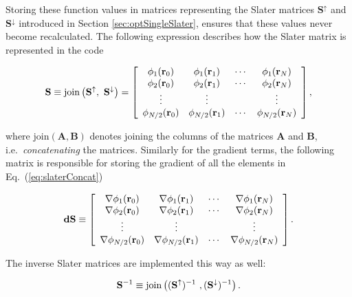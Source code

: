 Storing these function values in matrices representing the Slater matrices $\mathbf{S}^\uparrow$ and $\mathbf{S}^\downarrow$ introduced in Section \ref{sec:optSingleSlater}, ensures that these values never become recalculated. The following expression describes how the Slater matrix is represented in the code 

\begin{equation}
\label{eq:slaterConcat}
 \mathbf{S}  \equiv \mathrm{join}\left(\mathbf{S}^\uparrow,\,\,\mathbf{S}^\downarrow\right) = \left[ \begin{array}{cccc}
\phi_1(\mathbf{r}_0)     & \phi_1(\mathbf{r}_1)     & \cdots & \phi_1(\mathbf{r}_N)       \\
\phi_2(\mathbf{r}_0)     & \phi_2(\mathbf{r}_1)     & \cdots & \phi_2(\mathbf{r}_N)       \\
\vdots          & \vdots          &        & \vdots            \\
\phi_{N/2}(\mathbf{r}_0) & \phi_{N/2}(\mathbf{r}_1) & \cdots & \phi_{N/2}(\mathbf{r}_N)   \end{array} \right],
\end{equation}

where $\mathrm{join}(\mathbf{A}, \mathbf{B})$ denotes joining the columns of the matrices $\mathbf{A}$ and $\mathbf{B}$, i.e.~\textit{concatenating} the matrices\cite{linAlg}. Similarly for the gradient terms, the following matrix is responsible for storing the gradient of all the elements in Eq.~(\ref{eq:slaterConcat})

\begin{equation}
\label{eq:slaterDellConcat}
 \mathbf{dS} \equiv \left[ \begin{array}{cccc}
\nabla \phi_1(\mathbf{r}_0)     & \nabla \phi_1(\mathbf{r}_1)     & \cdots & \nabla \phi_1(\mathbf{r}_N)       \\
\nabla \phi_2(\mathbf{r}_0)     & \nabla \phi_2(\mathbf{r}_1)     & \cdots & \nabla \phi_2(\mathbf{r}_N)       \\
\vdots                 & \vdots                 &        & \vdots                   \\
\nabla \phi_{N/2}(\mathbf{r}_0) & \nabla \phi_{N/2}(\mathbf{r}_1) & \cdots & \nabla \phi_{N/2}(\mathbf{r}_N)   \end{array} \right].
\end{equation}

The inverse Slater matrices are implemented this way as well:

\begin{equation}
 \mathbf{S}^{-1} \equiv \mathrm{join}\left((\mathbf{S}^\uparrow)^{-1}\,\,,(\mathbf{S}^\downarrow)^{-1}\right).
\end{equation}

